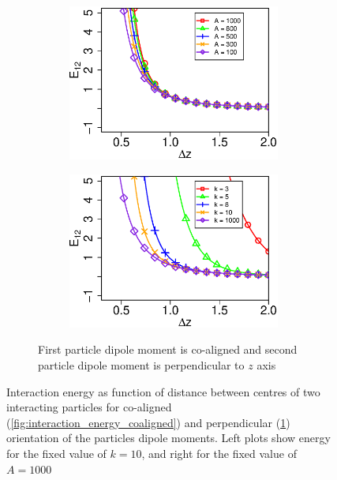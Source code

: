 \begin{figure}[h]
\begin{subfigure}{\textwidth}
\begin{subfigure}{.5\textwidth}
	\centering
	\includegraphics[width=\textwidth]{Images/k=10_perp}
\end{subfigure}
\begin{subfigure}{.5\textwidth}
	\centering
	\includegraphics[width=\textwidth]{Images/A=1000_perp}
\end{subfigure}
	\captionsetup{justification=centering, width=0.8\textwidth, singlelinecheck=false}
	\caption{First particle dipole moment is co-aligned and second particle dipole moment is perpendicular to $z$ axis}
    \label{fig:interaction_energy_counteraligned}
\end{subfigure}
\captionsetup{justification=centering, width=0.9\textwidth}
\caption{Interaction energy as function of distance between centres of two interacting particles for co-aligned (\ref{fig:interaction_energy_coaligned}) and perpendicular (\ref{fig:interaction_energy_counteraligned}) orientation of the particles dipole moments. Left plots show energy for the fixed value of $k = 10$, and right for the fixed value of $A = 1000$}
\label{fig:interaction_energy}
\end{figure}

